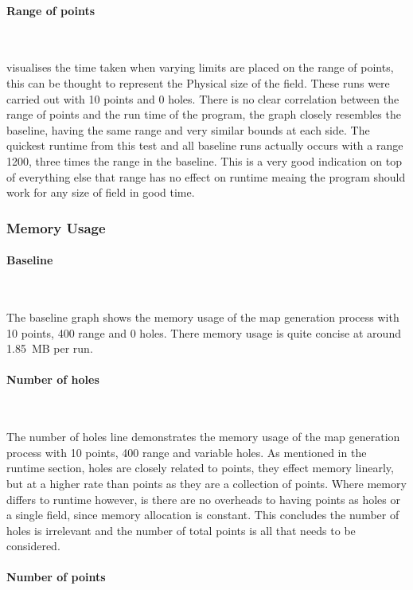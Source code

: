 \documentclass[final]{cmpreport_02}
\begin{document}
\paragraph{Range of points} \

 visualises the time taken when varying limits are placed on the range of points, this can be thought to represent the Physical size of the field.
These runs were carried out with 10 points and 0 holes.
There is no clear correlation between the range of points and the run time of the program, the graph closely resembles the baseline, having the same range and very similar bounds at each side.
The quickest runtime from this test and all baseline runs actually occurs with a range 1200, three times the range in the baseline.
This is a very good indication on top of everything else that range has no effect on runtime meaing the program should work for any size of field in good time.


\subsubsection{Memory Usage}


\paragraph{Baseline} \

The baseline graph shows the memory usage of the map generation process with 10 points, 400 range and 0 holes.
There memory usage is quite concise at around 1.85 MB per run.


\paragraph{Number of holes} \

The number of holes line demonstrates the memory usage of the map generation process with 10 points, 400 range and variable holes.
As mentioned in the runtime section, holes are closely related to points, they effect memory linearly, but at a higher rate than points as they are a collection of points.
Where memory differs to runtime however, is there are no overheads to having points as holes or a single field, since memory allocation is constant.
This concludes the number of holes is irrelevant and the number of total points is all that needs to be considered.

\paragraph{Number of points} \
\end{document}

